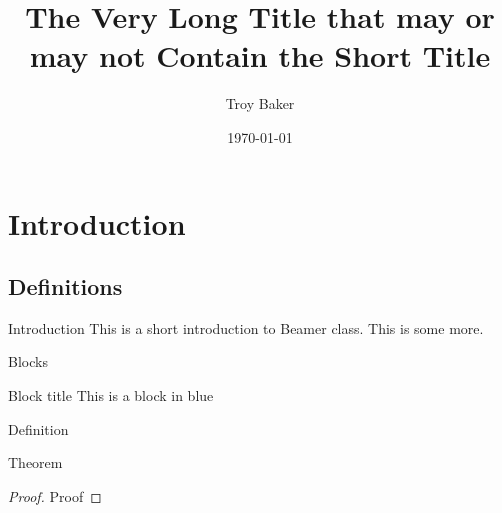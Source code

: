 \documentclass{mySlides}
\title[Short Title]{The Very Long Title that may or may not Contain the Short Title}
\author{Troy Baker}
\institute{University of Florida}
\date{\today}
\begin{document}
\begin{frame}
    \titlepage
\end{frame}


\section{Introduction}
\subsection{Definitions}
\begin{frame}{Introduction}
    This is a short introduction to Beamer class.
    \pause
    This is some more.
\end{frame}


\begin{frame}{Blocks}
    \begin{block}{Block title}
        This is a block in blue
    \end{block}

    \begin{definition}
        Definition
    \end{definition}

    \begin{theorem}
        Theorem
    \end{theorem}

    \begin{proof}
        Proof
    \end{proof}
\end{frame}
\end{document}
